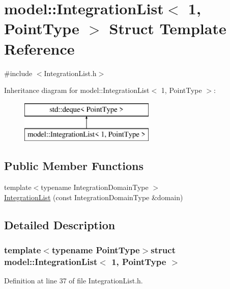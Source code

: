 \hypertarget{structmodel_1_1_integration_list_3_011_00_01_point_type_01_4}{}\section{model\+:\+:Integration\+List$<$ 1, Point\+Type $>$ Struct Template Reference}
\label{structmodel_1_1_integration_list_3_011_00_01_point_type_01_4}


{\ttfamily \#include $<$Integration\+List.\+h$>$}

Inheritance diagram for model\+:\+:Integration\+List$<$ 1, Point\+Type $>$\+:\begin{figure}[H]
\begin{center}
\leavevmode
\includegraphics[height=2.000000cm]{structmodel_1_1_integration_list_3_011_00_01_point_type_01_4}
\end{center}
\end{figure}
\subsection*{Public Member Functions}
\begin{DoxyCompactItemize}
\item 
{\footnotesize template$<$typename Integration\+Domain\+Type $>$ }\\\hyperlink{structmodel_1_1_integration_list_3_011_00_01_point_type_01_4_a866f06c35e4a2e7627ec31383171177b}{Integration\+List} (const Integration\+Domain\+Type \&domain)
\end{DoxyCompactItemize}


\subsection{Detailed Description}
\subsubsection*{template$<$typename Point\+Type$>$struct model\+::\+Integration\+List$<$ 1, Point\+Type $>$}



Definition at line 37 of file Integration\+List.\+h.



